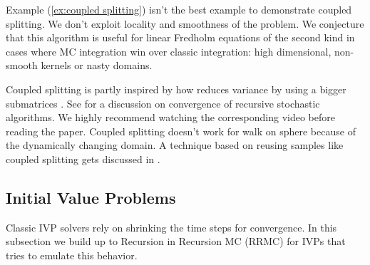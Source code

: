\documentclass[a4paper,12pt]{article}
\begin{document}
Example (\ref{ex:coupled splitting}) isn't the best example to demonstrate
coupled splitting. We don't exploit locality and smoothness of the problem.
We conjecture that this algorithm is useful for
linear Fredholm equations of the second kind in cases where MC integration win
over classic integration: high dimensional, non-smooth kernels or
nasty domains.

\begin{related}
    Coupled splitting is partly inspired by how \cite{sabelfeld_sparsified_2009}
    reduces variance by using a bigger submatrices .
    See \cite{gupta_convergence_2021} for a discussion on convergence
    of recursive stochastic algorithms. We highly recommend watching
    the corresponding video \cite{abhishek_gupta_recursive_2020} before reading
    the paper. Coupled splitting doesn't work for walk on sphere because
    of the dynamically changing domain. A technique based on reusing samples
    like coupled splitting  gets discussed in \cite{miller_boundary_2023}.
\end{related}


\subsection{Initial Value Problems}
Classic IVP solvers rely on shrinking the time steps for
convergence. In this subsection we build up to
Recursion in Recursion MC (RRMC) for IVPs that tries to emulate
this behavior.
\end{document}
